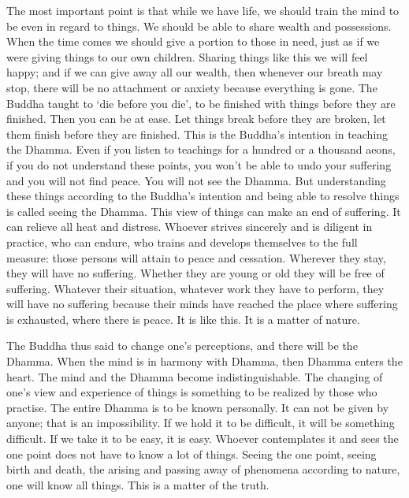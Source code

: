 The most important point is that while we have life, we should train the mind to be even in regard to things. We should be able to share wealth and possessions. When the time comes we should give a portion to those in need, just as if we were giving things to our own children. Sharing things like this we will feel happy; and if we can give away all our wealth, then whenever our breath may stop, there will be no attachment or anxiety because everything is gone. The Buddha taught to `die before you die', to be finished with things before they are finished. Then you can be at ease. Let things break before they are broken, let them finish before they are finished. This is the Buddha's intention in teaching the Dhamma. Even if you listen to teachings for a hundred or a thousand aeons, if you do not understand these points, you won't be able to undo your suffering and you will not find peace. You will not see the Dhamma. But understanding these things according to the Buddha's intention and being able to resolve things is called seeing the Dhamma. This view of things can make an end of suffering. It can relieve all heat and distress. Whoever strives sincerely and is diligent in practice, who can endure, who trains and develops themselves to the full measure: those persons will attain to peace and cessation. Wherever they stay, they will have no suffering. Whether they are young or old they will be free of suffering. Whatever their situation, whatever work they have to perform, they will have no suffering because their minds have reached the place where suffering is exhausted, where there is peace. It is like this. It is a matter of nature. 

The Buddha thus said to change one's perceptions, and there will be the Dhamma. When the mind is in harmony with Dhamma, then Dhamma enters the heart. The mind and the Dhamma become indistinguishable. The changing of one's view and experience of things is something to be realized by those who practise. The entire Dhamma is  to be known personally. It can not be given by anyone; that is an impossibility. If we hold it to be difficult, it will be something difficult. If we take it to be easy, it is easy. Whoever contemplates it and sees the one point does not have to know a lot of things. Seeing the one point, seeing birth and death, the arising and passing away of phenomena according to nature, one will know all things. This is a matter of the truth.


